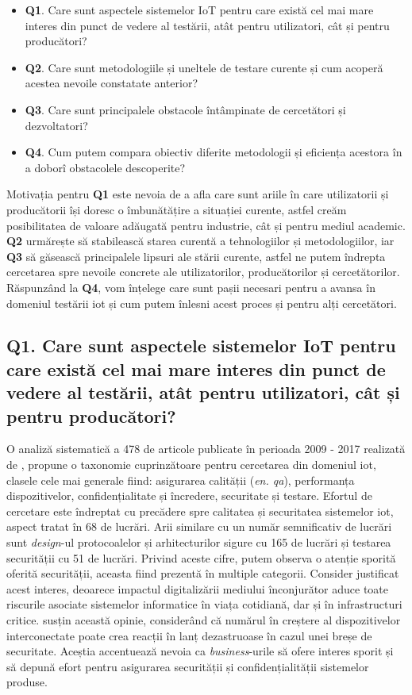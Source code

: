 \begin{itemize}
    \item[] \textbf{Q1}. Care sunt aspectele sistemelor IoT pentru care există cel mai mare interes din punct de vedere al testării, atât pentru utilizatori, cât și pentru producători?
    \item[] \textbf{Q2}. Care sunt metodologiile și uneltele de testare curente și cum acoperă acestea nevoile constatate anterior?
    \item[] \textbf{Q3}. Care sunt principalele obstacole întâmpinate de cercetători și dezvoltatori?
    \item[] \textbf{Q4}. Cum putem compara obiectiv diferite metodologii și eficiența acestora în a doborî obstacolele descoperite?
\end{itemize}

Motivația pentru \textbf{Q1} este nevoia de a afla care sunt ariile în care utilizatorii și producătorii își doresc o îmbunătățire a situației curente, astfel creăm posibilitatea de valoare adăugată pentru industrie, cât și pentru mediul academic. \textbf{Q2} urmărește să stabilească starea curentă a tehnologiilor și metodologiilor, iar \textbf{Q3} să găsească principalele lipsuri ale stării curente, astfel ne putem îndrepta cercetarea spre nevoile concrete ale utilizatorilor, producătorilor și cercetătorilor. Răspunzând la \textbf{Q4}, vom înțelege care sunt pașii necesari pentru a avansa în domeniul testării \acrshort{iot} și cum putem înlesni acest proces și pentru alți cercetători. 

\subsection*{Q1. Care sunt aspectele sistemelor IoT pentru care există cel mai mare interes din punct de vedere al testării, atât pentru utilizatori, cât și pentru producători?}

O analiză sistematică a 478 de articole publicate în perioada 2009 - 2017 realizată de \citet{Ahmed2019}, propune o taxonomie cuprinzătoare pentru cercetarea din domeniul \acrshort{iot}, clasele cele mai generale fiind: asigurarea calității (\textit{en. \acrlong{qa}}), performanța dispozitivelor, confidențialitate și încredere, securitate și testare. Efortul de cercetare este îndreptat cu precădere spre calitatea și securitatea sistemelor \acrshort{iot}, aspect tratat în 68 de lucrări. Arii similare cu un număr semnificativ de lucrări sunt \textit{design}-ul protocoalelor și arhitecturilor sigure cu 165 de lucrări și testarea securității cu 51 de lucrări. Privind aceste cifre, putem observa o atenție sporită oferită securității, aceasta fiind prezentă în multiple categorii. Consider justificat acest interes, deoarece impactul digitalizării mediului înconjurător aduce toate riscurile asociate sistemelor informatice în viața cotidiană, dar și în infrastructuri critice. \citet{Lee2015} susțin această opinie, considerând că numărul în creștere al dispozitivelor interconectate poate crea reacții în lanț dezastruoase în cazul unei breșe de securitate. Aceștia accentuează nevoia ca \textit{business}-urile să ofere interes sporit și să depună efort pentru asigurarea securității și confidențialității sistemelor produse.

